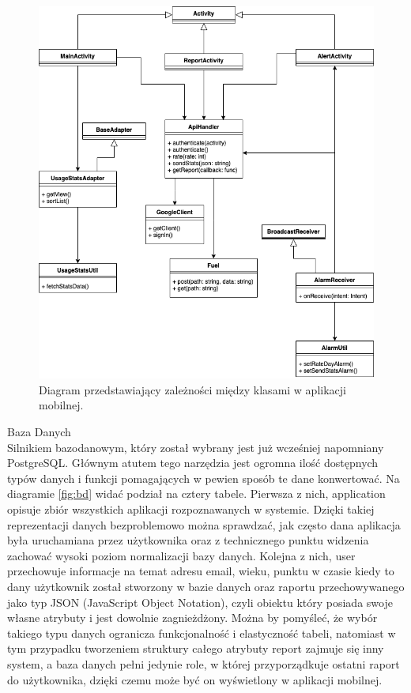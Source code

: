 \documentclass[a4paper,twoside,12pt]{book}
\begin{document}
\begin{description}
\begin{figure}[h!]
    \includegraphics[width=\textwidth]{images/track-app-mobile-diagram.png}
    \caption{Diagram przedstawiający zależności między klasami w aplikacji mobilnej.\protect\footnotemark}
    \label{fig:mobile_uml}
\end{figure}
\item Baza Danych \hfill \\
Silnikiem bazodanowym, który został wybrany jest już wcześniej napomniany PostgreSQL. Głównym atutem tego narzędzia jest ogromna ilość dostępnych typów danych i funkcji pomagających w pewien sposób te dane konwertować. Na diagramie \ref{fig:bd} widać podział na cztery tabele. Pierwsza z nich, application opisuje zbiór wszystkich aplikacji rozpoznawanych w systemie. Dzięki takiej reprezentacji danych bezproblemowo można sprawdzać, jak często dana aplikacja była uruchamiana przez użytkownika oraz z technicznego punktu widzenia zachować wysoki poziom normalizacji bazy danych. Kolejna z nich, user przechowuje informacje na temat adresu email, wieku, punktu w czasie kiedy to dany użytkownik został stworzony w bazie danych oraz raportu przechowywanego jako typ JSON (JavaScript Object Notation), czyli obiektu który posiada swoje własne atrybuty i jest dowolnie zagnieżdżony. Można by pomyśleć, że wybór takiego typu danych ogranicza funkcjonalność i elastyczność tabeli, natomiast w tym przypadku tworzeniem struktury całego atrybuty report zajmuje się inny system, a baza danych pełni jedynie role, w której przyporządkuje ostatni raport do użytkownika, dzięki czemu może być on wyświetlony w aplikacji mobilnej.   


\end{description}
\end{document}
